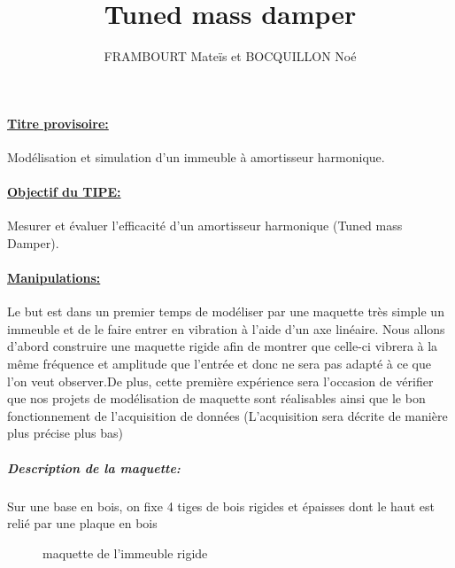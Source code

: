 \documentclass[a4paper]{article}
\title{ Tuned mass damper}
\author{FRAMBOURT Mateïs et BOCQUILLON Noé}
\begin{document}
	\maketitle
\paragraph{\underline{Titre provisoire:}} Modélisation et simulation d'un immeuble à amortisseur harmonique.
	
\paragraph{\underline{Objectif du TIPE:}}
  Mesurer et évaluer l'efficacité d'un amortisseur harmonique (Tuned mass Damper).
  
  \paragraph{\underline{Manipulations:}}
  Le but est dans un premier temps de modéliser par une maquette très simple un immeuble et de le faire entrer en vibration à l'aide d'un axe linéaire.
  Nous allons d'abord construire une maquette rigide afin de montrer que celle-ci vibrera à la même fréquence et amplitude que l'entrée et donc ne sera pas adapté à ce que l'on veut observer.De plus, cette première expérience sera l'occasion de vérifier que nos projets de modélisation de maquette sont réalisables ainsi que le bon fonctionnement de l'acquisition de données (L'acquisition sera décrite de manière plus précise plus bas)
 
\subparagraph{Description de la maquette:}Sur une base en bois, on fixe 4 tiges de bois rigides et épaisses dont le haut est relié par une plaque en bois %
\begin{figure}[h]
 \caption {maquette de l'immeuble rigide}
\end{figure}
\end{document}
